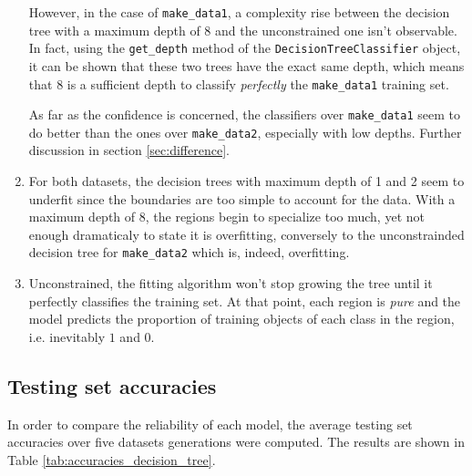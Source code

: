 \documentclass[a4paper, 12pt]{article}
\begin{document}
\begin{enumerate}[label = (\alph*)]
        However, in the case of \texttt{make\_data1}, a complexity rise between the decision tree with a maximum depth of \num{8} and the unconstrained one isn't observable. In fact, using the \texttt{get\_depth} method of the \texttt{DecisionTreeClassifier} object, it can be shown that these two trees have the exact same depth, which means that \num{8} is a sufficient depth to classify \emph{perfectly} the \texttt{make\_data1} training set.
        
        As far as the confidence is concerned, the classifiers over \texttt{make\_data1} seem to do better than the ones over \texttt{make\_data2}, especially with low depths. Further discussion in section \ref{sec:difference}.
        
        \item For both datasets, the decision trees with maximum depth of \num{1} and \num{2} seem to underfit since the boundaries are too simple to account for the data. With a maximum depth of \num{8}, the regions begin to specialize too much, yet not enough dramaticaly  to state it is overfitting, conversely to the unconstrainded decision tree for \texttt{make\_data2} which is, indeed, overfitting.
        
        \item Unconstrained, the fitting algorithm won't stop growing the tree until it perfectly classifies the training set. At that point, each region is \emph{pure} and the model predicts the proportion of training objects of each class in the region, i.e. inevitably $1$ and $0$.
    \end{enumerate}
        
    \subsection{Testing set accuracies} In order to compare the reliability of each model, the average testing set accuracies over five datasets generations were computed. The results are shown in Table \ref{tab:accuracies_decision_tree}.
    
\end{document}
